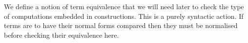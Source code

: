 We define a notion of term equivalence that we will need later
to check the type of computations embedded in constructions. This is a
purely syntactic action. If terms are to have their normal forms compared
then they must be normalised before checking their equivalence here.

\begin{code}%
\>[0]\AgdaSpace{}%
\AgdaSymbol{:}\AgdaSpace{}%
\AgdaSpace{}%
\AgdaSpace{}%
\AgdaSpace{}%
\AgdaSpace{}%
\AgdaSpace{}%
\AgdaSpace{}%
\AgdaSpace{}%
\<%
\\
\>[0]\AgdaSpace{}%
\AgdaSymbol{:}\AgdaSpace{}%
\AgdaSpace{}%
\AgdaSpace{}%
\AgdaSpace{}%
\AgdaSpace{}%
\AgdaSpace{}%
\AgdaSpace{}%
\AgdaSpace{}%
\AgdaSpace{}%
\AgdaSpace{}%
\<%
\end{code}
